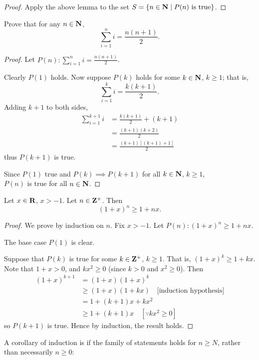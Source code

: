 \begin{proof}
Apply the above lemma to the set $S=\{n\in\mathbf N\mid P(n)\text{ is true}\}$.
\end{proof}

\begin{exercise}
Prove that for any $n\in\mathbf N$,
\[\sum_{i=1}^n i=\frac{n(n+1)}{2}.\]
\end{exercise}

\begin{proof}
Let $\displaystyle P(n):\sum_{i=1}^n i=\frac{n(n+1)}{2}$.

Clearly $P(1)$ holds. Now suppose $P(k)$ holds for some $k\in\mathbf N$, $k\ge1$; that is,
\[\sum_{i=1}^k i=\frac{k(k+1)}{2}.\]
Adding $k+1$ to both sides,
\begin{align*}
\sum_{i=1}^{k+1} i&=\frac{k(k+1)}{2}+(k+1)\\
&=\frac{(k+1)(k+2)}{2}\\
&=\frac{(k+1)[(k+1)+1]}{2}
\end{align*}
thus $P(k+1)$ is true.

Since $P(1)$ true and $P(k)\implies P(k+1)$ for all $k\in\mathbf N$, $k\ge1$,\\
$P(n)$ is true for all $n\in\mathbf N$.
\end{proof}

\begin{exercise}
Let $x\in\mathbf R$, $x>-1$. Let $n\in\mathbf Z^+$. Then
\[(1+x)^n\ge1+nx.\]
\end{exercise}

\begin{proof}
We prove by induction on $n$. Fix $x>-1$. Let $P(n):(1+x)^n\ge1+nx$.

The base case $P(1)$ is clear.

Suppose that $P(k)$ is true for some $k\in\mathbf Z^+$, $k\ge1$. That is, $(1+x)^k\ge1+kx$. Note that $1+x>0$, and $kx^2\ge0$ (since $k>0$ and $x^2\ge0$). Then
\begin{align*}
(1+x)^{k+1}&=(1+x)(1+x)^k\\
&\ge(1+x)(1+kx)\quad\text{[induction hypothesis]}\\
&=1+(k+1)x+kx^2\\
&\ge1+(k+1)x\quad[\because kx^2\ge0]
\end{align*}
so $P(k+1)$ is true. Hence by induction, the result holds.
\end{proof}

A corollary of induction is if the family of statements holds for $n\ge N$, rather than necessarily $n\ge0$:

